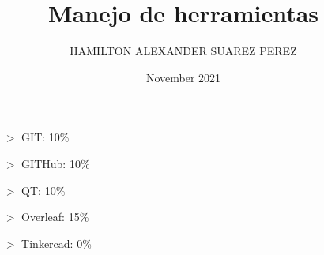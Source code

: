 \documentclass{article}
\title{Manejo de herramientas}
\author{HAMILTON ALEXANDER  SUAREZ PEREZ}
\date{November 2021}
\begin{document}
\maketitle

\centering
\begin{itemize}
    \item[$>$]  GIT: 10\%
    \item[$>$]  GITHub: 10\%
    \item[$>$]  QT: 10\%
    \item[$>$]  Overleaf: 15\%
    \item[$>$]  Tinkercad: 0\%
\end{itemize}
\end{document}
